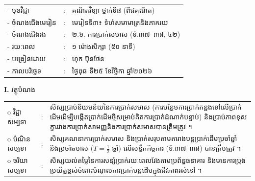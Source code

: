 \documentclass[a4paper,10pt]{article}
\newcommand{\wcirc}{{\CourierCirc\fontsize{9.5pt}{11pt}\selectfont o}}
\begin{document}
{\renewcommand{\arraystretch}{0.98}
\hspace*{3.1cm}%
\begin{tabular}{@{}l l L{11.0cm}@{}}
  - \hspace{0.35cm} មុខវិជ្ជា & : & គណិតវិទ្យា ថ្នាក់ទី៨ (ពីជគណិត) \\
  - \hspace{0.35cm} ចំណងជើងមេរៀន & : & មេរៀនទី៣៖ ទំហំសមាមាត្រនិងភាគរយ \\
  - \hspace{0.35cm} ចំណងជើងរង & : & ២.៦. ការប្រាក់សមាស (ទំ.៣៧–៣៨, ៤២) \\
  - \hspace{0.35cm} រយៈពេល & : & ១ ម៉ោងសិក្សា (៥០ នាទី) \\
  - \hspace{0.35cm} បង្រៀនដោយ & : & ហុក ប៊ុនថែន \\
  - \hspace{0.35cm} កាលបរិច្ឆេទ & : & ថ្ងៃពុធ ទី២៥ ខែវិច្ឆិកា ឆ្នាំ២០២៦ \\
\end{tabular}

\vspace{2pt}

\textbf{I.} {\muol វត្ថុបំណង}\\[1pt]
\hspace*{0.45cm}%
\begin{tabular}{@{}l l L{14.85cm}@{}}
  \wcirc \hspace{0.25cm} វិជ្ជាសម្បទា & : & សិស្សប្រាប់និយមន័យនៃការប្រាក់សមាស (ការបន្ថែមការប្រាក់កន្លងទៅលើប្រាក់ដើមដើម្បីបង្កើតប្រាក់ដើមថ្មីសម្រាប់គិតការប្រាក់ដំណាក់បន្ទាប់) និងប្រាប់ភាពខុសគ្នារវាងការប្រាក់សាមញ្ញនិងការប្រាក់សមាសបានត្រឹមត្រូវ ។ \\
  \wcirc \hspace{0.25cm} បំណិនសម្បទា & : & សិស្សគណនាការប្រាក់សមាស និងប្រាក់សរុបតាមតារាងបន្តប្រាក់ដើមប្រចាំឆ្នាំ និងប្រចាំឆមាស ($T = \frac{1}{2}$ ឆ្នាំ) លើសន្លឹកកិច្ចការ (ទំ.៣៧–៣៨) បានត្រឹមត្រូវ ។ \\
  \wcirc \hspace{0.25cm} ចរិយាសម្បទា & : & សិស្សយល់តម្លៃនៃការសន្សំប្រាក់រយៈពេលវែងតាមប្រព័ន្ធធនាគារ និងមានការប្រុងប្រយ័ត្នខ្ពស់ចំពោះបំណុលការប្រាក់បន្តដើមក្នុងជីវភាពរស់នៅ ។ \\
\end{tabular}

\vspace{2pt}

}
\end{document}

